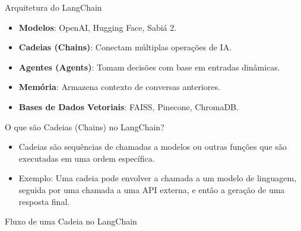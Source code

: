 \documentclass{beamer}
\begin{document}
\begin{frame}{Arquitetura do LangChain}
    \begin{itemize}
        \item \textbf{Modelos}: OpenAI, Hugging Face, Sabiá 2.
        \item \textbf{Cadeias (Chains)}: Conectam múltiplas operações de IA.
        \item \textbf{Agentes (Agents)}: Tomam decisões com base em entradas dinâmicas.
        \item \textbf{Memória}: Armazena contexto de conversas anteriores.
        \item \textbf{Bases de Dados Vetoriais}: FAISS, Pinecone, ChromaDB.
    \end{itemize}
\end{frame}

\begin{frame}{O que são Cadeias (Chains) no LangChain?}
\begin{itemize}
    \item Cadeias são sequências de chamadas a modelos ou outras funções que são executadas em uma ordem específica.
    \item Exemplo: Uma cadeia pode envolver a chamada a um modelo de linguagem, seguida por uma chamada a uma API externa, e então a geração de uma resposta final.
\end{itemize}
   \centering

\end{frame}

\begin{frame}{Fluxo de uma Cadeia no LangChain}
    \begin{center}
    \end{center}
\end{frame}
\end{document}
